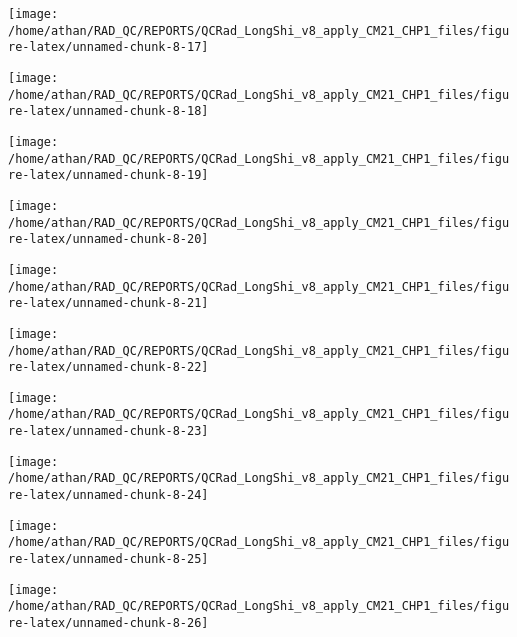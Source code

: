 \documentclass[
  10pt,
  a4paper,oneside]{article}
\begin{document}
\begin{center}\texttt{[image: /home/athan/RAD\_QC/REPORTS/QCRad\_LongShi\_v8\_apply\_CM21\_CHP1\_files/figure-latex/unnamed-chunk-8-17]} \end{center}

\begin{center}\texttt{[image: /home/athan/RAD\_QC/REPORTS/QCRad\_LongShi\_v8\_apply\_CM21\_CHP1\_files/figure-latex/unnamed-chunk-8-18]} \end{center}

\begin{center}\texttt{[image: /home/athan/RAD\_QC/REPORTS/QCRad\_LongShi\_v8\_apply\_CM21\_CHP1\_files/figure-latex/unnamed-chunk-8-19]} \end{center}

\begin{center}\texttt{[image: /home/athan/RAD\_QC/REPORTS/QCRad\_LongShi\_v8\_apply\_CM21\_CHP1\_files/figure-latex/unnamed-chunk-8-20]} \end{center}

\begin{center}\texttt{[image: /home/athan/RAD\_QC/REPORTS/QCRad\_LongShi\_v8\_apply\_CM21\_CHP1\_files/figure-latex/unnamed-chunk-8-21]} \end{center}

\begin{center}\texttt{[image: /home/athan/RAD\_QC/REPORTS/QCRad\_LongShi\_v8\_apply\_CM21\_CHP1\_files/figure-latex/unnamed-chunk-8-22]} \end{center}

\begin{center}\texttt{[image: /home/athan/RAD\_QC/REPORTS/QCRad\_LongShi\_v8\_apply\_CM21\_CHP1\_files/figure-latex/unnamed-chunk-8-23]} \end{center}

\begin{center}\texttt{[image: /home/athan/RAD\_QC/REPORTS/QCRad\_LongShi\_v8\_apply\_CM21\_CHP1\_files/figure-latex/unnamed-chunk-8-24]} \end{center}

\begin{center}\texttt{[image: /home/athan/RAD\_QC/REPORTS/QCRad\_LongShi\_v8\_apply\_CM21\_CHP1\_files/figure-latex/unnamed-chunk-8-25]} \end{center}

\begin{center}\texttt{[image: /home/athan/RAD\_QC/REPORTS/QCRad\_LongShi\_v8\_apply\_CM21\_CHP1\_files/figure-latex/unnamed-chunk-8-26]} \end{center}
\end{document}
